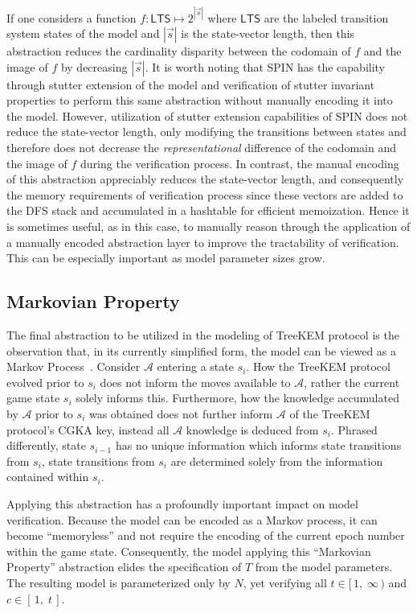 \documentclass[runningheads]{llncs}
\newcommand{\Adversary}{\ensuremath{\mathcal{A}}\xspace}
\newcommand{\NumericRange}[2]{\ensuremath{\left[\,#1,\; #2\,\right]}\xspace}
\newcommand{\NumericRangeOpenR}[2]{\ensuremath{[\,#1,\; #2\,)}\xspace}
\begin{document}
If one considers a function $f: \mathsf{LTS} \mapsto 2^{\left|\vec{s}\right|}$ where $\mathsf{LTS}$ are the labeled transition system states of the model and $\left|\vec{s}\right|$ is the state-vector length, then this abstraction reduces the cardinality disparity between the codomain of $f$ and the image of $f$ by decreasing $\left|\vec{s}\right|$.  
It is worth noting that SPIN has the capability through stutter extension of the model and verification of stutter invariant properties to perform this same abstraction without manually encoding it into the model.
However, utilization of stutter extension capabilities of SPIN does not reduce the state-vector length, only modifying the transitions between states and therefore does not decrease the \emph{representational} difference of the codomain and the image of $f$ during the verification process.
In contrast, the manual encoding of this abstraction appreciably reduces the state-vector length, and consequently the memory requirements of verification process since these vectors are added to the DFS stack and accumulated in a hashtable for efficient memoization.
Hence it is sometimes useful, as in this case, to manually reason through the application of a manually encoded abstraction layer to improve the tractability of verification.
This can be especially important as model parameter sizes grow.


\subsection{Markovian Property}

The final abstraction to be utilized in the modeling of TreeKEM protocol is the observation that, in its currently simplified form, the model can be viewed as a Markov Process~\cite{markov1906a}.
Consider \Adversary entering a \CGKAsec state $s_{i}$.
How the TreeKEM protocol evolved prior to $s_{i}$ does not inform the moves available to \Adversary, rather the current game state $s_{i}$ solely informs this.
Furthermore, how the knowledge accumulated by \Adversary prior to $s_{i}$ was obtained does not further inform \Adversary of the TreeKEM protocol's CGKA key, instead all \Adversary knowledge is deduced from $s_{i}$.
Phrased differently, state $s_{i-1}$ has no unique information which informs state transitions from $s_{i}$, state transitions from $s_{i}$ are determined solely from the information contained within $s_{i}$.

Applying this abstraction has a profoundly important impact on model verification.
Because the model can be encoded as a Markov process, it can become ``memoryless'' and not require the encoding of the current epoch number within the game state.
Consequently, the model applying this ``Markovian Property'' abstraction elides the specification of $T$ from the model parameters.
The resulting model is parameterized only by $N$, yet verifying all $t \in \NumericRangeOpenR{1}{\infty}$ and $c \in \NumericRange{1}{t}$.
\end{document}
